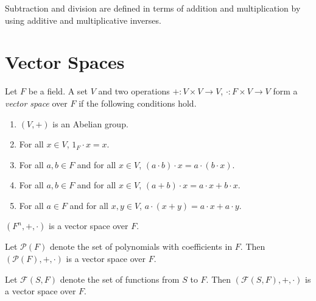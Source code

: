 \begin{remark}
  Subtraction and division are defined in terms of addition and
  multiplication by using additive and multiplicative inverses.
\end{remark}

\section{Vector Spaces}
\begin{definition}\label{def:vector-space}
  Let $F$ be a field.
  A set $V$ and two operations $+: V \times V \to V$,
  $\cdot: F \times V \to V$ form a \emph{vector space} over $F$
  if the following conditions hold.
  \begin{enumerate}
    \item $(V, +)$ is an Abelian group.
    \item For all $x \in V$, $1_F \cdot x = x$.
    \item For all $a, b \in F$ and for all $x \in V$,
      $(a \cdot b) \cdot x = a \cdot (b \cdot x)$.
    \item For all $a, b \in F$ and for all $x \in V$,
      $(a + b) \cdot x = a \cdot x + b \cdot x$.
    \item For all $a \in F$ and for all $x, y \in V$,
      $a \cdot (x + y) = a \cdot x + a \cdot y$.
  \end{enumerate}
\end{definition}
\begin{example}
  $(F^n, +, \cdot)$ is a vector space over $F$.
\end{example}
\begin{example}
  Let $\mathcal{P}(F)$ denote the set of polynomials with coefficients in $F$.
  Then $(\mathcal{P}(F), +, \cdot)$ is a vector space over $F$.
\end{example}
\begin{example}
  Let $\mathcal{F}(S, F)$ denote the set of functions from $S$ to $F$.
  Then $(\mathcal{F}(S, F), +, \cdot)$ is a vector space over $F$.
\end{example}

